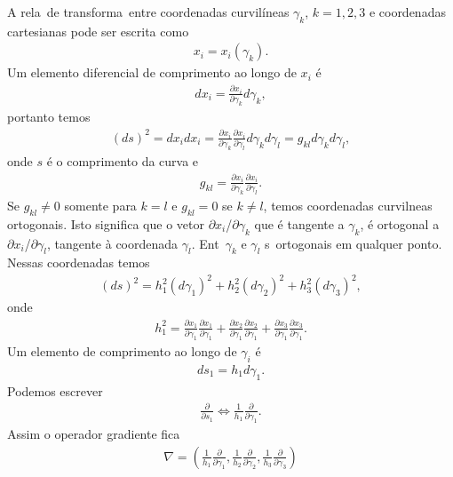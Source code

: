 A rela\cao\ de transforma\cao\ entre coordenadas curvil\'ineas
$\gamma_{k}$, $k = 1,2,3$ e coordenadas cartesianas pode ser
escrita como
\begin{eqnarray}
x_{i} = x_{i}(\gamma_{k}).
\end{eqnarray}
Um elemento diferencial de comprimento ao longo de $x_{i}$ \'e
\begin{eqnarray}
dx_{i} = \frac{\partial x_{i}}{\partial \gamma_{k}}d\gamma_{k},
\end{eqnarray}
portanto temos
\begin{eqnarray}
(ds)^{2} = dx_{i}dx_{i} = \frac{\partial x_{i}}{\partial
\gamma_{k}}\frac{\partial x_{i}}{\partial
\gamma_{l}}d\gamma_{k}d\gamma_{l} = g_{kl}d\gamma_{k}d\gamma_{l},
\end{eqnarray}
onde $s$ \'e o comprimento da curva e
\begin{eqnarray}
g_{kl} = \frac{\partial x_{i}}{\partial \gamma_{k}}\frac{\partial
x_{i}}{\partial \gamma_{l}}.
\end{eqnarray}
Se $g_{kl} \neq 0$ somente para $k = l$ e $g_{kl} = 0$ se $k \neq
l$, temos coordenadas curvil\ih neas ortogonais. Isto significa que
o vetor $\partial x_{i}$/$ \partial \gamma_{k}$ que \'e tangente a
$\gamma_{k}$, \'e ortogonal a $\partial x_{i}$/$\partial
\gamma_{l}$, tangente \`a coordenada $\gamma_{l}$. Ent\ao\
$\gamma_{k}$ e $\gamma_{l}$ s\ao\ ortogonais em qualquer ponto.
Nessas coordenadas temos
\begin{eqnarray}
(ds)^{2} = h_{1}^{2}(d\gamma_{1})^{2} + h_{2}^{2}(d\gamma_{2})^{2}
+ h_{3}^{2}(d\gamma_{3})^{2},
\end{eqnarray}
onde
\begin{eqnarray}
h_{1}^{2} = \frac{\partial x_{1}}{\partial
\gamma_{1}}\frac{\partial x_{1}}{\partial \gamma_{1}} +
\frac{\partial x_{2}}{\partial \gamma_{1}}\frac{\partial
x_{2}}{\partial \gamma_{1}} + \frac{\partial x_{3}}{\partial
\gamma_{1}}\frac{\partial x_{3}}{\partial \gamma_{1}}.
\end{eqnarray}
Um elemento de comprimento ao longo de $\gamma_{i}$ \'e
\begin{eqnarray}
ds_{1} = h_{1}d\gamma_{1}.
\end{eqnarray}
Podemos escrever
\begin{eqnarray}
\frac{\partial}{\partial s_{1}} \Leftrightarrow
\frac{1}{h_{1}}\frac{\partial}{\partial\gamma_{1}}.
\end{eqnarray}
Assim o operador gradiente fica
\begin{eqnarray}
\nabla = \left(
\frac{1}{h_{1}}\frac{\partial}{\partial\gamma_{1}},
\frac{1}{h_{2}}\frac{\partial}{\partial\gamma_{2}},
\frac{1}{h_{3}}\frac{\partial}{\partial\gamma_{3}}\right)
\end{eqnarray}

